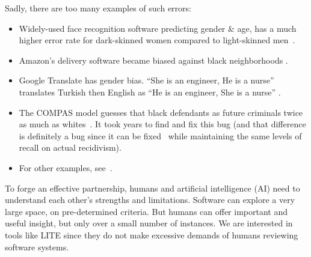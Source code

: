  
  Sadly,
there are too many examples of such errors:
\begin{itemize}

\item
Widely-used face recognition software   predicting    gender \& age, has a much
higher error rate for dark-skinned women compared to light-skinned men~\cite{Skin_Bias}.
\item  Amazon's  delivery  software    became   biased against black neighborhoods \cite{Amazon_Bias}. 
\item
  Google Translate  has gender bias. ``She is an engineer, He is a nurse''   translates    Turkish then
     English as ``He is an engineer, She is a nurse'' \cite{Caliskan183}.
  \item The COMPAS model guesses that  black defendants as future criminals   twice as much   as whites~\cite{Machine_Bias}.
  It took years to find and fix this bug
  (and that difference is definitely  a bug since it can be fixed~\cite{fse21} while  maintaining the same levels of recall on actual recidivism).
  \item For  other examples, see~\cite{rudin2019explaining,noble2018algorithms,gebru21}.
\end{itemize}
% 
To forge an effective partnership, humans and artificial intelligence (AI) need to understand each other's strengths and limitations. Software can explore a very large space,
on pre-determined criteria. But humans can offer important and useful insight, but only over
a small number of instances. We are interested in tools like 
LITE
since  they do not make excessive demands of humans reviewing software systems.



